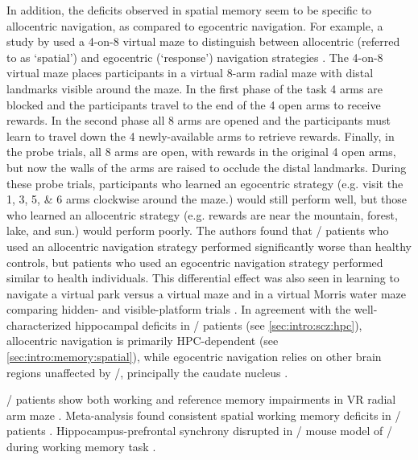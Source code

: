 In addition, the deficits observed in spatial memory seem to be specific to allocentric navigation, as compared to egocentric navigation.
For example, a study by \citeauthor{Wilkins2013} used a 4-on-8 virtual maze to distinguish between allocentric (referred to as `spatial') and egocentric (`response') navigation strategies \citep{Wilkins2013}.
The 4-on-8 virtual maze places participants in a virtual 8-arm radial maze with distal landmarks visible around the maze.
In the first phase of the task 4 arms are blocked and the participants travel to the end of the 4 open arms to receive rewards.
In the second phase all 8 arms are opened and the participants must learn to travel down the 4 newly-available arms to retrieve rewards.
Finally, in the probe trials, all 8 arms are open, with rewards in the original 4 open arms, but now the walls of the arms are raised to occlude the distal landmarks.
During these probe trials, participants who learned an egocentric strategy (e.g. visit the 1, 3, 5, \& 6 arms clockwise around the maze.) would still perform well, but those who learned an allocentric strategy (e.g. rewards are near the mountain, forest, lake, and sun.) would perform poorly.
The authors found that \scz/ patients who used an allocentric navigation strategy performed significantly worse than healthy controls, but patients who used an egocentric navigation strategy performed similar to health individuals.
This differential effect was also seen in learning to navigate a virtual park versus a virtual maze \citep{Weniger2008} and in a virtual Morris water maze comparing hidden- and visible-platform trials \citep{Hanlon2006}.
In agreement with the well-characterized hippocampal deficits in \scz/ patients (see \autoref{sec:intro:scz:hpc}), allocentric navigation is primarily \acs{HPC}-dependent (see \autoref{sec:intro:memory:spatial}), while egocentric navigation relies on other brain regions unaffected by \scz/, principally the caudate nucleus \citep{Hartley2003}.

\Scz/ patients show both working and reference memory impairments in VR radial arm maze \citep{Spieker2012}.
Meta-analysis found consistent spatial working memory deficits in \scz/ patients \citep{Piskulic2007}.
Hippocampus-prefrontal synchrony disrupted in \df/ mouse model of \scz/ during working memory task \citep{Sigurdsson2010}. 

